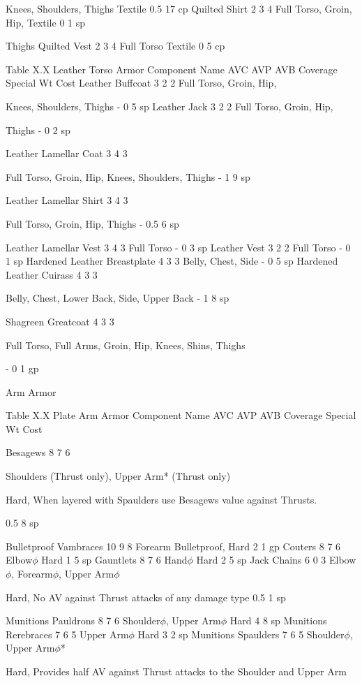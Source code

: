 \documentclass[oneside,11pt,english]{book}
\begin{document}
Knees, Shoulders, Thighs Textile 0.5 17 cp
Quilted Shirt 2 3 4 Full Torso, Groin, Hip, Textile 0 1 sp


Thighs
Quilted Vest 2 3 4 Full Torso Textile 0 5 cp

Table X.X Leather Torso Armor
Component Name AVC AVP AVB Coverage Special Wt Cost
Leather Buffcoat 3 2 2 Full Torso, Groin, Hip, 

Knees, Shoulders, Thighs - 0 5 sp
Leather Jack 3 2 2 Full Torso, Groin, Hip, 

Thighs - 0 2 sp

Leather Lamellar 
Coat 3 4 3

Full Torso, Groin, Hip, 
Knees, Shoulders, Thighs - 1 9 sp

Leather Lamellar 
Shirt 3 4 3

Full Torso, Groin, Hip, 
Thighs - 0.5 6 sp

Leather Lamellar 
Vest 3 4 3 Full Torso - 0 3 sp
Leather Vest 3 2 2 Full Torso - 0 1 sp
Hardened Leather 
Breastplate 4 3 3 Belly, Chest, Side - 0 5 sp
Hardened Leather 
Cuirass 4 3 3

Belly, Chest, Lower 
Back, Side, Upper Back - 1 8 sp

Shagreen 
Greatcoat 4 3 3

Full Torso, Full Arms, 
Groin, Hip, Knees, 
Shins, Thighs

- 0 1 gp

Arm Armor

Table X.X Plate Arm Armor
Component Name AVC AVP AVB Coverage Special Wt Cost

Besagews 8 7 6

Shoulders (Thrust only), 
Upper Arm* (Thrust 
only)

Hard, When layered with 
Spaulders use Besagews value 
against Thrusts.

0.5 8 sp

Bulletproof 
Vambraces 10 9 8 Forearm Bulletproof, Hard 2 1 gp
Couters 8 7 6 Elbow$\phi$ Hard 1 5 sp
Gauntlets 8 7 6 Hand$\phi$ Hard 2 5 sp
Jack Chains 6 0 3 Elbow$\phi$, Forearm$\phi$, 
Upper Arm$\phi$

Hard, No AV against Thrust 
attacks of any damage type 0.5 1 sp


Munitions 
Pauldrons 8 7 6 Shoulder$\phi$, Upper Arm$\phi$ Hard 4 8 sp
Munitions 
Rerebraces 7 6 5 Upper Arm$\phi$ Hard 3 2 sp
Munitions 
Spaulders 7 6 5 Shoulder$\phi$, Upper Arm$\phi$*

Hard, Provides half AV against 
Thrust attacks to the Shoulder 
and Upper Arm
\end{document}
